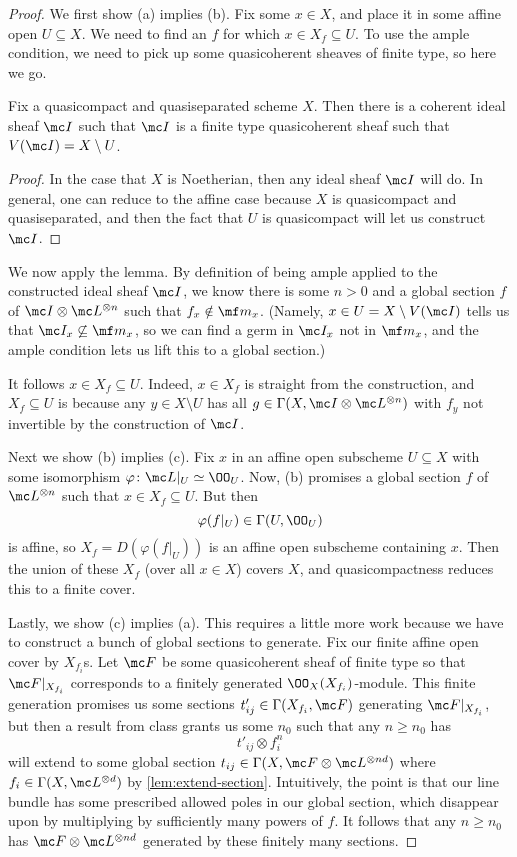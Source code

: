 \documentclass[../notes.tex]{subfiles}
\begin{document}
\begin{proof}
	We first show (a) implies (b). Fix some $x\in X$, and place it in some affine open $U\subseteq X$. We need to find an $f$ for which $x\in X_f\subseteq U$. To use the ample condition, we need to pick up some quasicoherent sheaves of finite type, so here we go.
	\begin{lem}
		Fix a quasicompact and quasiseparated scheme $X$. Then there is a coherent ideal sheaf $\mc I$ such that $\mc I$ is a finite type quasicoherent sheaf such that $V(\mc I)=X\setminus U$.
	\end{lem}
	\begin{proof}
		In the case that $X$ is Noetherian, then any ideal sheaf $\mc I$ will do. In general, one can reduce to the affine case because $X$ is quasicompact and quasiseparated, and then the fact that $U$ is quasicompact will let us construct $\mc I$.
	\end{proof}
	We now apply the lemma. By definition of being ample applied to the constructed ideal sheaf $\mc I$, we know there is some $n>0$ and a global section $f$ of $\mc I\otimes\mc L^{\otimes n}$ such that $f_x\notin\mf m_x$. (Namely, $x\in U=X\setminus V(\mc I)$ tells us that $\mc I_x\not\subseteq\mf m_x$, so we can find a germ in $\mc I_x$ not in $\mf m_x$, and the ample condition lets us lift this to a global section.)
	
	It follows $x\in X_f\subseteq U$. Indeed, $x\in X_f$ is straight from the construction, and $X_f\subseteq U$ is because any $y\in X\setminus U$ has all $g\in\Gamma(X,\mc I\otimes\mc L^{\otimes n})$ with $f_y$ not invertible by the construction of $\mc I$.

	Next we show (b) implies (c). Fix $x$ in an affine open subscheme $U\subseteq X$ with some isomorphism $\varphi\colon\mc L|_U\simeq\OO_U$. Now, (b) promises a global section $f$ of $\mc L^{\otimes n}$ such that $x\in X_f\subseteq U$. But then
	\[\varphi(f|_U)\in\Gamma(U,\OO_U)\]
	is affine, so $X_f=D(\varphi(f|_U))$ is an affine open subscheme containing $x$. Then the union of these $X_f$ (over all $x\in X$) covers $X$, and quasicompactness reduces this to a finite cover.

	Lastly, we show (c) implies (a). This requires a little more work because we have to construct a bunch of global sections to generate. Fix our finite affine open cover by $X_{f_i}$s. Let $\mc F$ be some quasicoherent sheaf of finite type so that $\mc F|_{X_{f_i}}$ corresponds to a finitely generated $\OO_X(X_{f_i})$-module. This finite generation promises us some sections $t_{ij}'\in\Gamma(X_{f_i},\mc F)$ generating $\mc F|_{X_{f_i}}$, but then a result from class grants us some $n_0$ such that any $n\ge n_0$ has
	\[t'_{ij}\otimes f_i^{n}\]
	will extend to some global section $t_{ij}\in\Gamma(X,\mc F\otimes\mc L^{\otimes nd})$ where $f_i\in\Gamma(X,\mc L^{\otimes d})$ by \autoref{lem:extend-section}. Intuitively, the point is that our line bundle has some prescribed allowed poles in our global section, which disappear upon by multiplying by sufficiently many powers of $f$. It follows that any $n\ge n_0$ has $\mc F\otimes\mc L^{\otimes nd}$ generated by these finitely many sections.


\end{proof}
\end{document}
